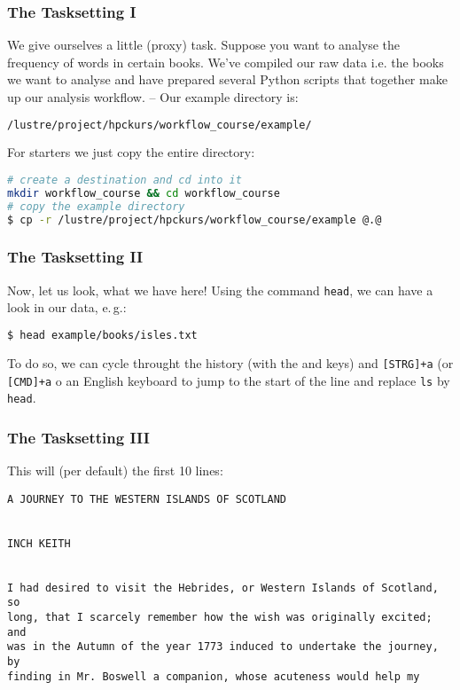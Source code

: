 \begin{frame}[fragile]
  \frametitle{The Tasksetting I}
  We give ourselves a little (proxy) task. Suppose you want to analyse the frequency of words in certain books.\newline
  \pause
  We’ve compiled our raw data i.e. the books we want to analyse and have prepared several Python scripts that together make up our analysis workflow. -- Our example directory is:
  \begin{lstlisting}[language=Bash, style=Shell]
/lustre/project/hpckurs/workflow_course/example/
  \end{lstlisting}
  For starters we just copy the entire directory:
  \begin{lstlisting}[language=Bash, style=Shell]
# create a destination and cd into it
mkdir workflow_course && cd workflow_course
# copy the example directory
$ cp -r /lustre/project/hpckurs/workflow_course/example @.@
  \end{lstlisting}
\end{frame}

\begin{frame}[fragile]
  \frametitle{The Tasksetting II}
  Now, let us look, what we have here!\newline
  Using the command \texttt{head}, we can have a look in our data, e.\,g.:
  \begin{lstlisting}[language=Bash, style=Shell, basicstyle=\ttfamily\footnotesize]
$ head example/books/isles.txt
  \end{lstlisting}
  To do so, we can cycle throught the history (with the \textuparrow and \textdownarrow keys) and \texttt{[STRG]+a} (or \texttt{[CMD]+a} o an English keyboard to jump to the start of the line and replace \texttt{ls} by \texttt{head}.
\end{frame}

\begin{frame}[fragile]
  \frametitle{The Tasksetting III}
  This will (per default) the first 10 lines:
  \begin{lstlisting}[style=Plain, basicstyle=\ttfamily\tiny]
A JOURNEY TO THE WESTERN ISLANDS OF SCOTLAND


INCH KEITH


I had desired to visit the Hebrides, or Western Islands of Scotland, so
long, that I scarcely remember how the wish was originally excited; and
was in the Autumn of the year 1773 induced to undertake the journey, by
finding in Mr. Boswell a companion, whose acuteness would help my
  \end{lstlisting}
  \pause
\end{frame}

